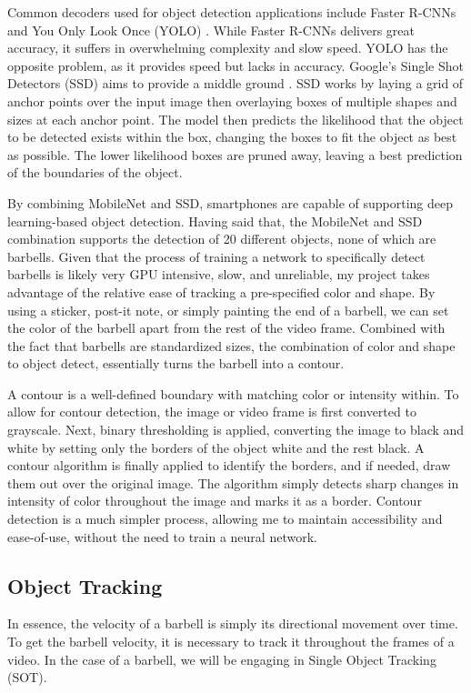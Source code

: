 \documentclass[10pt,twocolumn]{article}
\begin{document}
Common decoders used for object detection applications include Faster R-CNNs and You Only Look Once (YOLO) \cite{Ren2015,Redmon2015}.
While Faster R-CNNs delivers great accuracy, it suffers in overwhelming complexity and slow speed.
YOLO has the opposite problem, as it provides speed but lacks in accuracy.
Google's Single Shot Detectors (SSD) aims to provide a middle ground \cite{Liu2015}.
SSD works by laying a grid of anchor points over the input image then overlaying boxes of multiple shapes and sizes at each anchor point.
The model then predicts the likelihood that the object to be detected exists within the box, changing the boxes to fit the object as best as possible.
The lower likelihood boxes are pruned away, leaving a best prediction of the boundaries of the object. \par

By combining MobileNet and SSD, smartphones are capable of supporting deep learning-based object detection.
Having said that, the MobileNet and SSD combination supports the detection of 20 different objects, none of which are barbells.
Given that the process of training a network to specifically detect barbells is likely very GPU intensive, slow, and unreliable, my project takes advantage of the relative ease of tracking a pre-specified color and shape.
By using a sticker, post-it note, or simply painting the end of a barbell, we can set the color of the barbell apart from the rest of the video frame. 
Combined with the fact that barbells are standardized sizes, the combination of color and shape to object detect, essentially turns the barbell into a contour. \par

A contour is a well-defined boundary with matching color or intensity within.
To allow for contour detection, the image or video frame is first converted to grayscale.
Next, binary thresholding is applied, converting the image to black and white by setting only the borders of the object white and the rest black.
A contour algorithm is finally applied to identify the borders, and if needed, draw them out over the original image.
The algorithm simply detects sharp changes in intensity of color throughout the image and marks it as a border. 
Contour detection is a much simpler process, allowing me to maintain accessibility and ease-of-use, without the need to train a neural network. \par

\subsection{Object Tracking}
In essence, the velocity of a barbell is simply its directional movement over time.
To get the barbell velocity, it is necessary to track it throughout the frames of a video.
In the case of a barbell, we will be engaging in Single Object Tracking (SOT). \par
\end{document}
